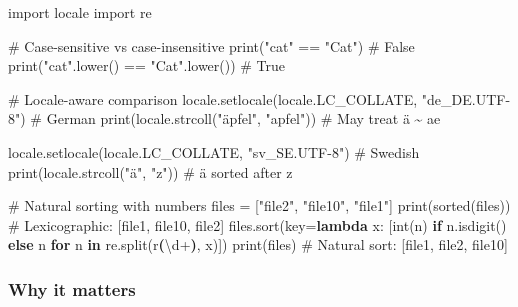\documentclass[
  letterpaper,
  DIV=11,
  numbers=noendperiod]{scrreprt}
\newenvironment{Shaded}{\begin{snugshade}}{\end{snugshade}}
\newcommand{\BuiltInTok}[1]{\textcolor[rgb]{0.00,0.23,0.31}{#1}}
\newcommand{\CommentTok}[1]{\textcolor[rgb]{0.37,0.37,0.37}{#1}}
\newcommand{\ControlFlowTok}[1]{\textcolor[rgb]{0.00,0.23,0.31}{\textbf{#1}}}
\newcommand{\DecValTok}[1]{\textcolor[rgb]{0.68,0.00,0.00}{#1}}
\newcommand{\ImportTok}[1]{\textcolor[rgb]{0.00,0.46,0.62}{#1}}
\newcommand{\KeywordTok}[1]{\textcolor[rgb]{0.00,0.23,0.31}{\textbf{#1}}}
\newcommand{\NormalTok}[1]{\textcolor[rgb]{0.00,0.23,0.31}{#1}}
\newcommand{\OperatorTok}[1]{\textcolor[rgb]{0.37,0.37,0.37}{#1}}
\newcommand{\StringTok}[1]{\textcolor[rgb]{0.13,0.47,0.30}{#1}}
\newcommand{\VerbatimStringTok}[1]{\textcolor[rgb]{0.13,0.47,0.30}{#1}}
\begin{document}
\begin{Shaded}
\begin{Highlighting}[]
\ImportTok{import}\NormalTok{ locale}
\ImportTok{import}\NormalTok{ re}

\CommentTok{\# Case{-}sensitive vs case{-}insensitive}
\BuiltInTok{print}\NormalTok{(}\StringTok{"cat"} \OperatorTok{==} \StringTok{"Cat"}\NormalTok{)            }\CommentTok{\# False}
\BuiltInTok{print}\NormalTok{(}\StringTok{"cat"}\NormalTok{.lower() }\OperatorTok{==} \StringTok{"Cat"}\NormalTok{.lower())  }\CommentTok{\# True}

\CommentTok{\# Locale{-}aware comparison}
\NormalTok{locale.setlocale(locale.LC\_COLLATE, }\StringTok{"de\_DE.UTF{-}8"}\NormalTok{)  }\CommentTok{\# German}
\BuiltInTok{print}\NormalTok{(locale.strcoll(}\StringTok{"äpfel"}\NormalTok{, }\StringTok{"apfel"}\NormalTok{))  }\CommentTok{\# May treat ä \textasciitilde{} ae}

\NormalTok{locale.setlocale(locale.LC\_COLLATE, }\StringTok{"sv\_SE.UTF{-}8"}\NormalTok{)  }\CommentTok{\# Swedish}
\BuiltInTok{print}\NormalTok{(locale.strcoll(}\StringTok{"ä"}\NormalTok{, }\StringTok{"z"}\NormalTok{))  }\CommentTok{\# ä sorted after z}

\CommentTok{\# Natural sorting with numbers}
\NormalTok{files }\OperatorTok{=}\NormalTok{ [}\StringTok{"file2"}\NormalTok{, }\StringTok{"file10"}\NormalTok{, }\StringTok{"file1"}\NormalTok{]}
\BuiltInTok{print}\NormalTok{(}\BuiltInTok{sorted}\NormalTok{(files))   }\CommentTok{\# Lexicographic: [\textquotesingle{}file1\textquotesingle{}, \textquotesingle{}file10\textquotesingle{}, \textquotesingle{}file2\textquotesingle{}]}
\NormalTok{files.sort(key}\OperatorTok{=}\KeywordTok{lambda}\NormalTok{ x: [}\BuiltInTok{int}\NormalTok{(n) }\ControlFlowTok{if}\NormalTok{ n.isdigit() }\ControlFlowTok{else}\NormalTok{ n }\ControlFlowTok{for}\NormalTok{ n }\KeywordTok{in}\NormalTok{ re.split(}\VerbatimStringTok{r\textquotesingle{}}\KeywordTok{(}\DecValTok{\textbackslash{}d}\OperatorTok{+}\KeywordTok{)}\VerbatimStringTok{\textquotesingle{}}\NormalTok{, x)])}
\BuiltInTok{print}\NormalTok{(files)           }\CommentTok{\# Natural sort: [\textquotesingle{}file1\textquotesingle{}, \textquotesingle{}file2\textquotesingle{}, \textquotesingle{}file10\textquotesingle{}]}
\end{Highlighting}
\end{Shaded}

\subsubsection{Why it matters}\label{why-it-matters-37}
\end{document}
